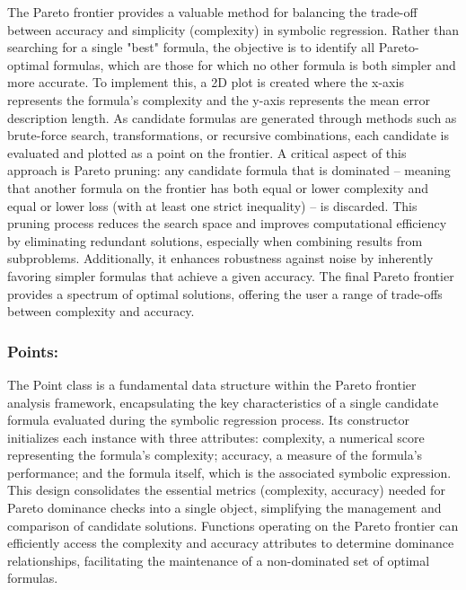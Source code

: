 \documentclass{article}
\begin{document}
The Pareto frontier provides a valuable method for balancing the trade-off between accuracy and simplicity (complexity) in symbolic regression. Rather than searching for a single "best" formula, the objective is to identify all Pareto-optimal formulas, which are those for which no other formula is both simpler and more accurate. To implement this, a 2D plot is created where the x-axis represents the formula's complexity and the y-axis represents the mean error description length. As candidate formulas are generated through methods such as brute-force search, transformations, or recursive combinations, each candidate is evaluated and plotted as a point on the frontier. A critical aspect of this approach is Pareto pruning: any candidate formula that is dominated – meaning that another formula on the frontier has both equal or lower complexity and equal or lower loss (with at least one strict inequality) – is discarded. This pruning process reduces the search space and improves computational efficiency by eliminating redundant solutions, especially when combining results from subproblems. Additionally, it enhances robustness against noise by inherently favoring simpler formulas that achieve a given accuracy. The final Pareto frontier provides a spectrum of optimal solutions, offering the user a range of trade-offs between complexity and accuracy.\\



\subsubsection{Points:}


The Point class is a fundamental data structure within the Pareto frontier analysis framework, encapsulating the key characteristics of a single candidate formula evaluated during the symbolic regression process. Its constructor initializes each instance with three attributes: complexity, a numerical score representing the formula's complexity; accuracy, a measure of the formula's performance; and the formula itself, which is the associated symbolic expression. This design consolidates the essential metrics (complexity, accuracy) needed for Pareto dominance checks into a single object, simplifying the management and comparison of candidate solutions. Functions operating on the Pareto frontier can efficiently access the complexity and accuracy attributes to determine dominance relationships, facilitating the maintenance of a non-dominated set of optimal formulas.\\
\end{document}
